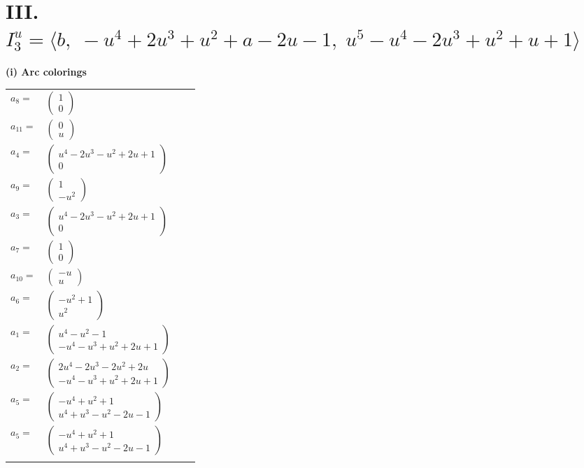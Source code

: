 \documentclass[1p]{elsarticle_modified}
\theoremstyle{definition}
\begin{document}
\centering \section*{III. $I^u_{3}= \langle b,\;- u^4+2 u^3+u^2+a-2 u-1,\;u^5- u^4-2 u^3+u^2+u+1 \rangle$}
\flushleft \textbf{(i) Arc colorings}\\
\begin{tabular}{m{7pt} m{180pt} m{7pt} m{180pt} }
\flushright $a_{8}=$&$\begin{pmatrix}1\\0\end{pmatrix}$ \\
\flushright $a_{11}=$&$\begin{pmatrix}0\\u\end{pmatrix}$ \\
\flushright $a_{4}=$&$\begin{pmatrix}u^4-2 u^3- u^2+2 u+1\\0\end{pmatrix}$ \\
\flushright $a_{9}=$&$\begin{pmatrix}1\\- u^2\end{pmatrix}$ \\
\flushright $a_{3}=$&$\begin{pmatrix}u^4-2 u^3- u^2+2 u+1\\0\end{pmatrix}$ \\
\flushright $a_{7}=$&$\begin{pmatrix}1\\0\end{pmatrix}$ \\
\flushright $a_{10}=$&$\begin{pmatrix}- u\\u\end{pmatrix}$ \\
\flushright $a_{6}=$&$\begin{pmatrix}- u^2+1\\u^2\end{pmatrix}$ \\
\flushright $a_{1}=$&$\begin{pmatrix}u^4- u^2-1\\- u^4- u^3+u^2+2 u+1\end{pmatrix}$ \\
\flushright $a_{2}=$&$\begin{pmatrix}2 u^4-2 u^3-2 u^2+2 u\\- u^4- u^3+u^2+2 u+1\end{pmatrix}$ \\
\flushright $a_{5}=$&$\begin{pmatrix}- u^4+u^2+1\\u^4+u^3- u^2-2 u-1\end{pmatrix}$\\ \flushright $a_{5}=$&$\begin{pmatrix}- u^4+u^2+1\\u^4+u^3- u^2-2 u-1\end{pmatrix}$\\&\end{tabular}
\end{document}
